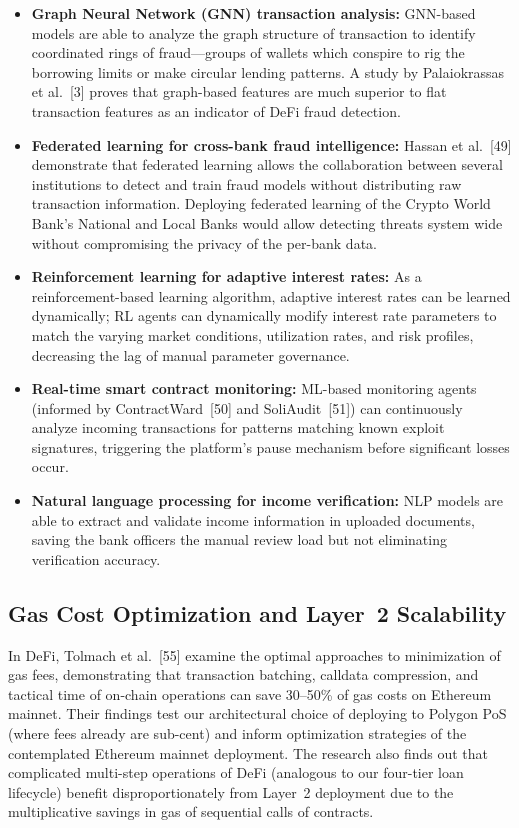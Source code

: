 \documentclass[12pt,a4paper]{report}
\begin{document}
\begin{itemize}[noitemsep]
\item \textbf{Graph Neural Network (GNN) transaction analysis:} GNN-based models are able to analyze the graph structure of transaction to identify coordinated rings of fraud---groups of wallets which conspire to rig the borrowing limits or make circular lending patterns. A study by Palaiokrassas et al.~[3] proves that graph-based features are much superior to flat transaction features as an indicator of DeFi fraud detection.

\item \textbf{Federated learning for cross-bank fraud intelligence:} Hassan et al.~[49] demonstrate that federated learning allows the collaboration between several institutions to detect and train fraud models without distributing raw transaction information. Deploying federated learning of the Crypto World Bank's National and Local Banks would allow detecting threats system wide without compromising the privacy of the per-bank data.

\item \textbf{Reinforcement learning for adaptive interest rates:} As a reinforcement-based learning algorithm, adaptive interest rates can be learned dynamically; RL agents can dynamically modify interest rate parameters to match the varying market conditions, utilization rates, and risk profiles, decreasing the lag of manual parameter governance.

\item \textbf{Real-time smart contract monitoring:} ML-based monitoring agents (informed by ContractWard~[50] and SoliAudit~[51]) can continuously analyze incoming transactions for patterns matching known exploit signatures, triggering the platform's pause mechanism before significant losses occur.

\item \textbf{Natural language processing for income verification:} NLP models are able to extract and validate income information in uploaded documents, saving the bank officers the manual review load but not eliminating verification accuracy.
\end{itemize}

\subsection{Gas Cost Optimization and Layer~2 Scalability}

In DeFi, Tolmach et al.~[55] examine the optimal approaches to minimization of gas fees, demonstrating that transaction batching, calldata compression, and tactical time of on-chain operations can save 30--50\% of gas costs on Ethereum mainnet. Their findings test our architectural choice of deploying to Polygon PoS (where fees already are sub-cent) and inform optimization strategies of the contemplated Ethereum mainnet deployment. The research also finds out that complicated multi-step operations of DeFi (analogous to our four-tier loan lifecycle) benefit disproportionately from Layer~2 deployment due to the multiplicative savings in gas of sequential calls of contracts.
\end{document}
